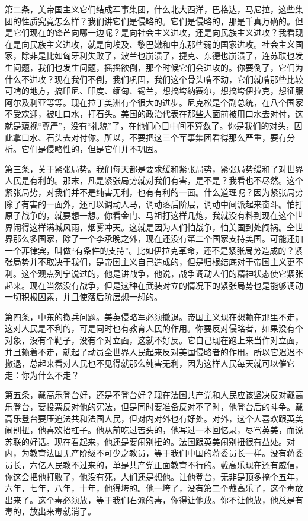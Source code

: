第二条，美帝国主义它们结成军事集团，什么北大西洋，巴格达，马尼拉，这些集团的性质究竟怎么样？我们讲它们是侵略的。它们是侵略的，那是千真万确的。但是它们现在的锋芒向哪一边呢？是向社会主义进攻，还是向民族主义进攻？我看现在是向民族主义进攻，就是向埃及、黎巴嫩和中东那些弱的国家进攻。社会主义国家，除非是比如匈牙利失败了，波兰也崩溃了，捷克、东德也崩溃了，连苏联也发生问题，我们也发生问题，摇摇欲倒，那个时候它们会进攻的。你要倒了，它们为什么不进攻？现在我们不倒，我们巩固，我们这个骨头啃不动，它们就啃那些比较可啃的地方，搞印尼、印度、缅甸、锡兰，想搞垮纳赛尔，想搞垮伊拉克，想征服阿尔及利亚等等。现在拉丁美洲有个很大的进步。尼克松是个副总统，在八个国家不受欢迎，被吐口水，打石头。美国的政治代表在那些人面前被用口水去对付，这就是藐视“尊严”，没有“礼貌”了，在他们心目中间不算数了。你是我们的对头，因此拿口水、石头去对付你。所以，不要把这三个军事集团看得那么严重，要有分析。它们是侵略性的，但是它们并不巩固。

第三条，关于紧张局势。我们每天都是要求缓和紧张局势，紧张局势缓和了对世界人民是有利的。那末，凡是紧张局势就对我们有害，是不是？我看也不尽然。这个紧张局势，对我们并不是纯害无利，也有有利的一面。什么道理呢？因为紧张局势除了有害的一面外，还可以调动人马，调动落后阶层，调动中间派起来奋斗。怕打原子战争的，就要想一想。你看金门、马祖打这样几炮，我就没有料到现在这个世界闹得这样满城风雨，烟雾冲天。这就是因为人们怕战争，怕美国到处闯祸。全世界那么多国家，除了一个李承晚之外，现在还没有第二个国家支持美国。可能还加一个菲律宾，叫做“有条件的支持”。比如伊拉克革命，还不是紧张局势造成的？紧张局势并不取决于我们，是帝国主义自己造成的，但是归根结底对于帝国主义更不利。这个观点列宁说过的，他是讲战争，他说，战争调动人们的精神状态使它紧张起来。现在当然没有战争，但是这种在武装对立的情况下的紧张局势也是能够调动一切积极因素，并且使落后阶层想一想的。

第四条，中东的撤兵问题。美英侵略军必须撤退。帝国主义现在想赖在那里不走，这对人民是不利的，可是同时也有教育人民的作用。你要反对侵略者，如果没有个对象，没有个靶子，没有个对立面，这就不好反。它自己现在跑上来当作对立面，并且赖着不走，就起了动员全世界人民起来反对美国侵略者的作用。所以它迟迟不撤退，总起来看对人民也不见得就那么纯害无利，因为这样人民每天就可以催它走：你为什么不走？

第五条，戴高乐登台好，还是不登台好？现在法国共产党和人民应该坚决反对戴高乐登台，要投票反对他的宪法，但是同时要准备反对不了时，他登台后的斗争。戴高乐登台要压迫法共和法国人民，但对内对外也有好处。对外，这个人喜欢跟英美闹别扭，他喜欢抬杠子。他从前吃过苦头的，他写过一本回忆录，尽骂英美，而说苏联的好话。现在看起来，他还是要闹别扭的。法国跟英美闹别扭很有益处。对内，为教育法国无产阶级不可少之教员，等于我们中国的蒋委员长一样。没有蒋委员长，六亿人民教不过来的，单是共产党正面教育不行的。戴高乐现在还有威信，你这会把他打败了，他没有死，人们还是想他。让他登台，无非是顶多搞个五年，六年，七年，八年，十年，他得垮的。他一垮了，没有第二个戴高乐了，这个毒放出来了。这个毒必须放，等于我们右派的毒，你得让他放。你不让他放，他总是有毒的，放出来毒就消了。

